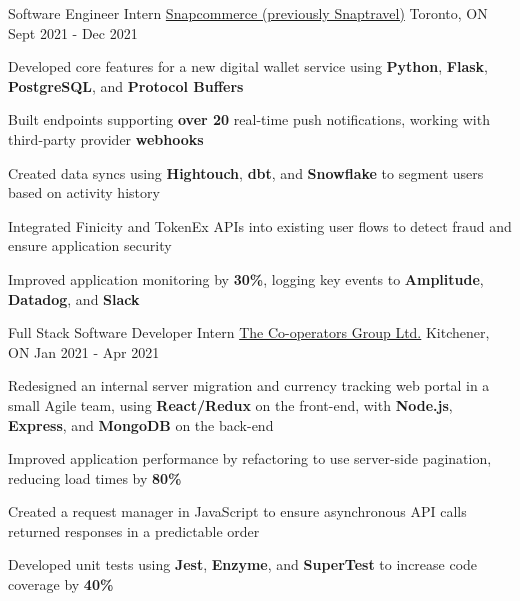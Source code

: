 
\begin{cventries}
  \cventry
    {Software Engineer Intern} %
    {\href{https://www.snapcommerce.com/}{Snapcommerce (previously Snaptravel)}} %
    {Toronto, ON} %
    {Sept 2021 - Dec 2021} %
    {
      \begin{cvitems} %
      \item {Developed core features for a new digital wallet service using \textbf{Python}, \textbf{Flask}, \textbf{PostgreSQL}, and \textbf{Protocol Buffers}}
      \item {Built endpoints supporting \textbf{over 20} real-time push notifications, working with third-party provider \textbf{webhooks}}
      \item {Created data syncs using \textbf{Hightouch}, \textbf{dbt}, and \textbf{Snowflake} to segment users based on activity history}
      \item {Integrated Finicity and TokenEx APIs into existing user flows to detect fraud and ensure application security}
      \item {Improved application monitoring by \textbf{30\%}, logging key events to \textbf{Amplitude}, \textbf{Datadog}, and \textbf{Slack}}
      \end{cvitems}
    }

  \cventry
    {Full Stack Software Developer Intern} %
    {\href{https://www.cooperators.ca/}{The Co-operators Group Ltd.}} %
    {Kitchener, ON} %
    {Jan 2021 - Apr 2021} %
    {
      \begin{cvitems} %
      \item {Redesigned an internal server migration and currency tracking web portal in a small Agile team, using \textbf{React/Redux} on the front-end, with \textbf{Node.js}, \textbf{Express}, and \textbf{MongoDB} on the back-end}
      \item {Improved application performance by refactoring to use server-side pagination, reducing load times by \textbf{80\%}}
      \item {Created a request manager in JavaScript to ensure asynchronous API calls returned responses in a predictable order}
      \item {Developed unit tests using \textbf{Jest}, \textbf{Enzyme}, and \textbf{SuperTest} to increase code coverage by \textbf{40\%}}
      \end{cvitems}
    }
    

\end{cventries}
